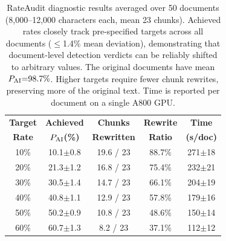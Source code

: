 \begin{table}[t]
\centering
\small
\begin{tabular}{c cc cc}
\toprule
\textbf{Target} & \textbf{Achieved} & \textbf{Chunks} & \textbf{Rewrite} & \textbf{Time} \\
\textbf{Rate} & $P_{\text{AI}}$\textbf{(\%)} & \textbf{Rewritten} & \textbf{Ratio} & \textbf{(s/doc)} \\
\midrule
10\% & 10.1$\pm$0.8 & 19.6 / 23 & 88.7\% & 271$\pm$18 \\
20\% & 21.3$\pm$1.2 & 16.8 / 23 & 75.4\% & 232$\pm$21 \\
30\% & 30.5$\pm$1.4 & 14.7 / 23 & 66.1\% & 204$\pm$19 \\
40\% & 40.8$\pm$1.1 & 12.9 / 23 & 57.8\% & 179$\pm$16 \\
50\% & 50.2$\pm$0.9 & 10.8 / 23 & 48.6\% & 150$\pm$14 \\
60\% & 60.7$\pm$1.3 &  8.2 / 23 & 37.1\% & 112$\pm$12 \\
\bottomrule
\end{tabular}
\caption{RateAudit diagnostic results averaged over 50 documents (8{,}000--12{,}000 characters each, mean 23 chunks). Achieved rates closely track pre-specified targets across all documents ($\leq$1.4\% mean deviation), demonstrating that document-level detection verdicts can be reliably shifted to arbitrary values. The original documents have mean $P_{\text{AI}}{=}98.7\%$. Higher targets require fewer chunk rewrites, preserving more of the original text. Time is reported per document on a single A800 GPU.}
\label{tab:allocator}
\end{table}
